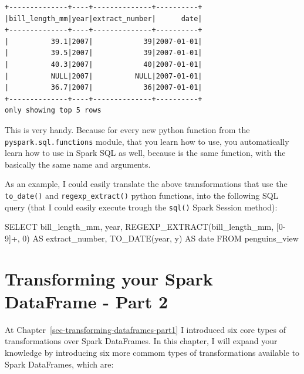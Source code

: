 \documentclass[
  11pt,
  letterpaper,
  DIV=11,
  numbers=noendperiod]{scrreprt}
\newenvironment{Shaded}{\begin{snugshade}}{\end{snugshade}}
\newcommand{\DataTypeTok}[1]{\textcolor[rgb]{0.68,0.00,0.00}{#1}}
\newcommand{\DecValTok}[1]{\textcolor[rgb]{0.68,0.00,0.00}{#1}}
\newcommand{\FunctionTok}[1]{\textcolor[rgb]{0.28,0.35,0.67}{#1}}
\newcommand{\KeywordTok}[1]{\textcolor[rgb]{0.00,0.23,0.31}{#1}}
\newcommand{\NormalTok}[1]{\textcolor[rgb]{0.00,0.23,0.31}{#1}}
\newcommand{\StringTok}[1]{\textcolor[rgb]{0.13,0.47,0.30}{#1}}
\begin{document}
\begin{verbatim}
+--------------+----+--------------+----------+
|bill_length_mm|year|extract_number|      date|
+--------------+----+--------------+----------+
|          39.1|2007|            39|2007-01-01|
|          39.5|2007|            39|2007-01-01|
|          40.3|2007|            40|2007-01-01|
|          NULL|2007|          NULL|2007-01-01|
|          36.7|2007|            36|2007-01-01|
+--------------+----+--------------+----------+
only showing top 5 rows
\end{verbatim}

This is very handy. Because for every new python function from the
\texttt{pyspark.sql.functions} module, that you learn how to use, you
automatically learn how to use in Spark SQL as well, because is the same
function, with the basically the same name and arguments.

As an example, I could easily translate the above transformations that
use the \texttt{to\_date()} and \texttt{regexp\_extract()} python
functions, into the following SQL query (that I could easily execute
trough the \texttt{sql()} Spark Session method):

\begin{Shaded}
\begin{Highlighting}[]
\KeywordTok{SELECT} 
\NormalTok{  bill\_length\_mm, }\DataTypeTok{year}\NormalTok{,}
\NormalTok{  REGEXP\_EXTRACT(bill\_length\_mm, }\StringTok{\textquotesingle{}[0{-}9]+\textquotesingle{}}\NormalTok{, }\DecValTok{0}\NormalTok{) }\KeywordTok{AS}\NormalTok{ extract\_number,}
  \FunctionTok{TO\_DATE}\NormalTok{(}\DataTypeTok{year}\NormalTok{, }\StringTok{\textquotesingle{}y\textquotesingle{}}\NormalTok{) }\KeywordTok{AS} \DataTypeTok{date}
\KeywordTok{FROM}\NormalTok{ penguins\_view}
\end{Highlighting}
\end{Shaded}


\hypertarget{transforming-your-spark-dataframe---part-2}{%
\chapter{Transforming your Spark DataFrame - Part
2}\label{transforming-your-spark-dataframe---part-2}}

At Chapter~\ref{sec-transforming-dataframes-part1} I introduced six core
types of transformations over Spark DataFrames. In this chapter, I will
expand your knowledge by introducing six more commom types of
transformations available to Spark DataFrames, which are:
\end{document}
